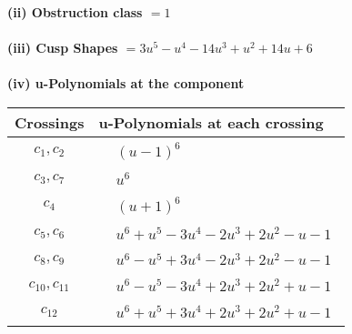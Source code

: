 \documentclass[1p]{elsarticle_modified}
\theoremstyle{definition}
\begin{document}
\flushleft \textbf{(ii) Obstruction class $= 1$}\\~\\
\flushleft \textbf{(iii) Cusp Shapes $= 3 u^5- u^4-14 u^3+u^2+14 u+6$}\\~\\
\newpage\renewcommand{\arraystretch}{1}
\flushleft \textbf{(iv) u-Polynomials at the component}\newline \\
\begin{tabular}{m{50pt}|m{274pt}}
Crossings & \hspace{64pt}u-Polynomials at each crossing \\
\hline $$\begin{aligned}c_{1},c_{2}\end{aligned}$$&$\begin{aligned}
&(u-1)^6
\end{aligned}$\\
\hline $$\begin{aligned}c_{3},c_{7}\end{aligned}$$&$\begin{aligned}
&u^6
\end{aligned}$\\
\hline $$\begin{aligned}c_{4}\end{aligned}$$&$\begin{aligned}
&(u+1)^6
\end{aligned}$\\
\hline $$\begin{aligned}c_{5},c_{6}\end{aligned}$$&$\begin{aligned}
&u^6+u^5-3 u^4-2 u^3+2 u^2- u-1
\end{aligned}$\\
\hline $$\begin{aligned}c_{8},c_{9}\end{aligned}$$&$\begin{aligned}
&u^6- u^5+3 u^4-2 u^3+2 u^2- u-1
\end{aligned}$\\
\hline $$\begin{aligned}c_{10},c_{11}\end{aligned}$$&$\begin{aligned}
&u^6- u^5-3 u^4+2 u^3+2 u^2+u-1
\end{aligned}$\\
\hline $$\begin{aligned}c_{12}\end{aligned}$$&$\begin{aligned}
&u^6+u^5+3 u^4+2 u^3+2 u^2+u-1
\end{aligned}$\\
\hline
\end{tabular}\\~\\
\end{document}
